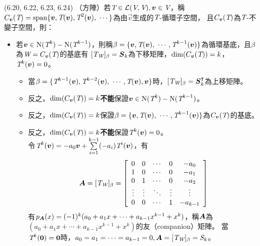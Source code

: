 \item \begin{theorem}{(6.20, 6.22, 6.23, 6.24)} （方陣）若$\textit{T} \in \mathcal{L}(\textit{V}, \textit{V}), \boldsymbol{v} \in \textit{V}$，稱\\$C_{\vec{v}}(\T) = \spn\{\vec{v}, \T(\vec{v}), \T^2(\vec{v}), \ \cdots\}$為由$\vec{v}$生成的$\textit{T}$-循環子空間，
	且$C_{\boldsymbol{v}}(\textit{T})$為$\textit{T}$-不變子空間，則：
	\begin{itemize}
		\item 若$\boldsymbol{v} \in \operatorname{N}(\textit{T}^k) - \operatorname{N}(\textit{T}^{k - 1})$，則稱$\beta = \{\boldsymbol{v}, \textit{T}(\boldsymbol{v}), \ \cdots, \textit{T}^{k - 1}(\boldsymbol{v})\}$為循環基底，且$\beta$為$\textit{W} = C_{\boldsymbol{v}}(\textit{T})$的基底有
		$[\textit{T}_{\textit{W}}]_{\beta} = \boldsymbol{S}_k$為下移矩陣，$\dim(C_{\boldsymbol{v}}(\textit{T})) = k$，$\textit{T}^k(\boldsymbol{v}) = 0$。
		\begin{itemize}
			\item 當$\beta = \{\textit{T}^{k - 1}(\boldsymbol{v}), \textit{T}^{k - 2}(\boldsymbol{v}), \ \cdots, \textit{T}(\boldsymbol{v}), \boldsymbol{v}\}$時，$[\textit{T}_{\textit{W}}]_{\beta} = \boldsymbol{S}^\intercal_k$為上移矩陣。
			\item 反之，$\dim(C_{\boldsymbol{v}}(\textit{T})) = k$\textbf{不能}保證$\boldsymbol{v} \in \operatorname{N}(\textit{T}^k) - \operatorname{N}(\textit{T}^{k - 1})$。
			\item 反之，$\dim(C_{\boldsymbol{v}}(\textit{T})) = k$保證$\beta = \{\boldsymbol{v}, \textit{T}(\boldsymbol{v}), \ \cdots, \textit{T}^{k - 1}(\boldsymbol{v})\}$為$C_{\boldsymbol{v}}(\textit{T})$的基底。
			\item 反之，$\dim(C_{\boldsymbol{v}}(\textit{T})) = k$\textbf{不能}保證$\textit{T}^k(\boldsymbol{v}) = 0$。\\
				令$\textit{T}^k(\boldsymbol{v}) = -a_0\boldsymbol{v} + \sum\limits_{i = 1}^{k - 1}(-a_{i})\textit{T}^{i}(\boldsymbol{v})$，有
				\begin{equation}
					\boldsymbol{A} = [\textit{T}_{\textit{W}}]_{\beta} = 
					{\left[ 
					\begin{array}{ccccc}
						0 & 0 & \cdots & 0 & -a_0 \\
						1 & 0 & \cdots & 0 & -a_1 \\
						0 & 1 & \cdots & 0 & -a_2 \\
						\vdots & \vdots & \ddots & \vdots & \vdots \\
						0 & 0 & \cdots & 1 & -a_{k - 1} \\
					\end{array} 
					\right]}
				\end{equation}
				有$p_{\boldsymbol{A}}(x) = (-1)^k(a_0 + a_1x + \cdots + a_{k - 1}x^{k - 1} + x^k)$，稱$\boldsymbol{A}$為$(a_0 + a_1x + \cdots + a_{k - 1}x^{k - 1} + x^k)$的友（companion）矩陣。
				當$\textit{T}^k(\boldsymbol{0}) = \boldsymbol{0}$時，$a_0 = a_1 = \cdots = a_{k - 1} = 0, \boldsymbol{A} = [\textit{T}_{\textit{W}}]_{\beta} = \textit{S}_k$。
		\end{itemize}
	\end{itemize}
\end{theorem}

